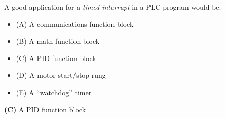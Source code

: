 

A good application for a {\it timed interrupt} in a PLC program would be:

\begin{itemize}
\item{(A)} A communications function block
\vskip 5pt 
\item{(B)} A math function block
\vskip 5pt 
\item{(C)} A PID function block
\vskip 5pt 
\item{(D)} A motor start/stop rung
\vskip 5pt 
\item{(E)} A ``watchdog'' timer
\end{itemize}







{\bf (C)} A PID function block
 










